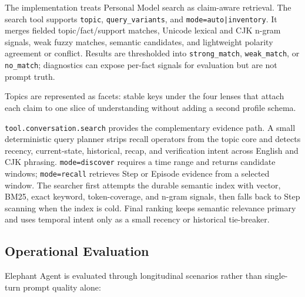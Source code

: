 The implementation treats Personal Model search as claim-aware retrieval. The
search tool supports \texttt{topic}, \texttt{query\_variants}, and
\texttt{mode=auto|inventory}. It merges fielded topic/fact/support
matches, Unicode lexical and CJK n-gram signals, weak fuzzy matches, semantic
candidates, and lightweight polarity agreement or conflict. Results are
thresholded into \texttt{strong\_match}, \texttt{weak\_match}, or
\texttt{no\_match}; diagnostics can expose per-fact signals for evaluation but
are not prompt truth.

Topics are represented as facets: stable keys under the four lenses that attach
each claim to one slice of understanding without adding a second profile schema.

\texttt{tool.conversation.search} provides the complementary evidence path. A
small deterministic query planner strips recall operators from the topic core
and detects recency, current-state, historical, recap, and verification intent
across English and CJK phrasing. \texttt{mode=discover} requires a time range
and returns candidate windows; \texttt{mode=recall} retrieves Step or Episode
evidence from a selected window. The searcher first attempts the durable
semantic index with vector, BM25, exact keyword, token-coverage, and n-gram
signals, then falls back to Step scanning when the index is cold. Final ranking
keeps semantic relevance primary and uses temporal intent only as a small
recency or historical tie-breaker.

\subsection{Operational Evaluation}

Elephant Agent is evaluated through longitudinal scenarios rather than single-turn prompt
quality alone:

